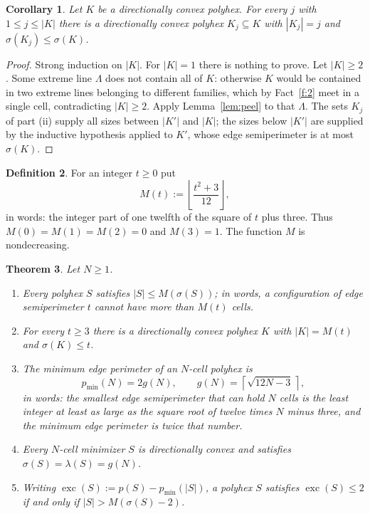 \documentclass[11pt]{article}
\theoremstyle{plain}
\newtheorem{theorem}{Theorem}[section]
\newtheorem{corollary}[theorem]{Corollary}
\theoremstyle{definition}
\newtheorem{definition}[theorem]{Definition}
\theoremstyle{remark}
\DeclareMathOperator{\exc}{exc}
\begin{document}
\begin{corollary}\label{cor:subsets}
Let \(K\) be a directionally convex polyhex. For every \(j\) with \(1\le j\le|K|\) there is
a directionally convex polyhex \(K_{j}\subseteq K\) with \(|K_{j}|=j\) and
\(\sigma(K_{j})\le\sigma(K)\).
\end{corollary}

\begin{proof}
Strong induction on \(|K|\). For \(|K|=1\) there is nothing to prove. Let \(|K|\ge2\). Some
extreme line \(\Lambda\) does not contain all of \(K\): otherwise \(K\) would be contained
in two extreme lines belonging to different families, which by Fact~\ref{f:2} meet in a
single cell, contradicting \(|K|\ge2\). Apply Lemma~\ref{lem:peel} to that \(\Lambda\). The
sets \(K_{j}\) of part (ii) supply all sizes between \(|K'|\) and \(|K|\); the sizes below
\(|K'|\) are supplied by the inductive hypothesis applied to \(K'\), whose edge
semiperimeter is at most \(\sigma(K)\).
\end{proof}

\begin{definition}\label{def:M}
For an integer \(t\ge0\) put
\[
   M(t):=\left\lfloor\frac{t^{2}+3}{12}\right\rfloor ,
\]
in words: the integer part of one twelfth of the square of \(t\) plus three. Thus
\(M(0)=M(1)=M(2)=0\) and \(M(3)=1\). The function \(M\) is nondecreasing.
\end{definition}

\begin{theorem}\label{thm:capacity}
Let \(N\ge1\).
\begin{enumerate}
\item[(a)] Every polyhex \(S\) satisfies \(|S|\le M(\sigma(S))\); in words, a configuration
of edge semiperimeter \(t\) cannot have more than \(M(t)\) cells.
\item[(b)] For every \(t\ge3\) there is a directionally convex polyhex \(K\) with
\(|K|=M(t)\) and \(\sigma(K)\le t\).
\item[(c)] The minimum edge perimeter of an \(N\)-cell polyhex is
\[
   p_{\min}(N)=2g(N),\qquad g(N)=\left\lceil\sqrt{12N-3}\,\right\rceil ,
\]
in words: the smallest edge semiperimeter that can hold \(N\) cells is the least integer at
least as large as the square root of twelve times \(N\) minus three, and the minimum edge
perimeter is twice that number.
\item[(d)] Every \(N\)-cell minimizer \(S\) is directionally convex and satisfies
\(\sigma(S)=\lambda(S)=g(N)\).
\item[(e)] Writing \(\exc(S):=p(S)-p_{\min}(|S|)\), a polyhex \(S\) satisfies
\(\exc(S)\le2\) if and only if \(|S|>M(\sigma(S)-2)\).
\end{enumerate}
\end{theorem}
\end{document}
